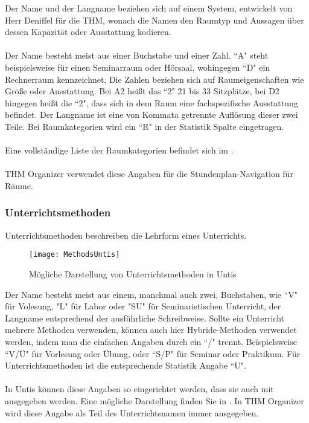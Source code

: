 Der Name und der Langname beziehen sich auf einem System, entwickelt von Herr Deniffel für die THM, wonach die Namen den Raumtyp und Aussagen über dessen Kapazität oder Ausstattung kodieren.\\
\\
Der Name besteht meist aus einer Buchstabe und einer Zahl. ``A" steht beispielsweise für einen  Seminarraum oder Hörsaal, wohingegen ``D" ein Rechnerraum kennzeichnet. Die Zahlen beziehen sich auf Raumeigenschaften wie Größe oder Ausstattung. Bei A2 heißt das ``2" 21 bis 33 Sitzplätze, bei D2 hingegen heißt die ``2", dass sich in dem Raum eine fachspezifische Ausstattung befindet. Der Langname ist eine von Kommata getrennte Auflösung dieser zwei Teile. Bei Raumkategorien wird ein ``R" in der Statistik Spalte eingetragen.\\
\\
Eine vollständige Liste der Raumkategorien befindet sich im .\\
\\
THM Organizer verwendet diese Angaben für die Stundenplan-Navigation für Räume.\\

\subsubsection{Unterrichtsmethoden}

Unterrichtsmethoden beschreiben die Lehrform eines Unterrichts.\\

\begin{wrapfigure}{r}{0.35\textwidth}
	\vspace{-14pt}
	\texttt{[image: MethodsUntis]}
	\vspace{-5pt}
	\caption{Mögliche Darstellung von Unterrichtsmethoden in Untis}
	\label{fig:methoden-untis}
	\vspace{-5pt}
\end{wrapfigure}

\noindent
Der Name besteht meist aus einem, manchmal auch zwei, Buchstaben, wie ``V" für Volesung, "L" für Labor oder "SU" für Seminaristischen Unterricht, der Langname entsprechend der ausführliche Schreibweise. Sollte ein Unterricht mehrere Methoden verwenden, können auch hier Hybride-Methoden verwendet werden, indem man die einfachen Angaben durch ein ``/" trennt. Beispielsweise ``V/Ü"  für Vorlesung oder Übung, oder ``S/P" für Seminar oder Praktikum. Für Unterrichtsmethoden ist die entsprechende Statistik Angabe ``U".\\
\\
In Untis können diese Angaben so eingerichtet werden, dass sie auch mit ausgegeben werden. Eine mögliche Darstellung finden Sie in . In THM Organizer wird diese Angabe als Teil des Unterrichtsnamen immer ausgegeben.\\

